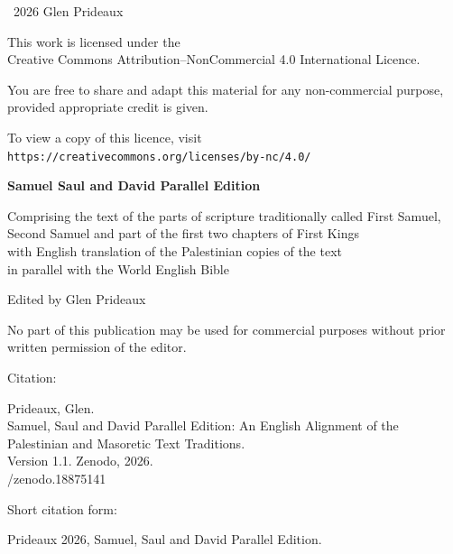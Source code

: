 \clearpage
\thispagestyle{empty}
\vspace*{\fill}

\small
\textcopyright\ 2026 Glen Prideaux

\vspace{1em}

This work is licensed under the\\
Creative Commons Attribution–NonCommercial 4.0 International Licence.

\vspace{1em}

You are free to share and adapt this material for any non-commercial purpose,
provided appropriate credit is given.

\vspace{1em}

To view a copy of this licence, visit\\
\texttt{https://creativecommons.org/licenses/by-nc/4.0/}

\vspace{2em}

\textbf{Samuel Saul and David Parallel Edition}

Comprising the text of the parts of scripture traditionally called First
Samuel,\\
Second Samuel and part of the first two chapters of First Kings\\
with
English translation of the Palestinian copies of the text\\
in parallel
with the World English Bible

\vspace{1em}

Edited by Glen Prideaux

\vspace{2em}

No part of this publication may be used for commercial purposes
without prior written permission of the editor.

{
\setlength{\parindent}{1cm}%
\noindent Citation:\par
\indent Prideaux, Glen.\\
\indent Samuel, Saul and David Parallel Edition: An English Alignment
of the Palestinian and Masoretic Text Traditions.\\
\indent Version 1.1. Zenodo, 2026.\\
/zenodo.18875141

\noindent Short citation form:\par
\indent Prideaux 2026, Samuel, Saul and David Parallel Edition.
}

